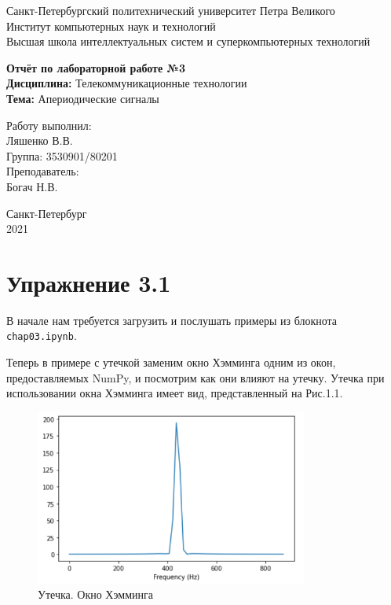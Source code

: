 \documentclass[a4paper,12pt]{report}
\begin{document}
 

\begin{titlepage}
\newpage
	\begin{center}
		\large Санкт-Петербургский политехнический университет Петра Великого\\
		Институт компьютерных наук и технологий\\
		Высшая школа интеллектуальных систем и суперкомпьютерных технологий\\
	\end{center}
\vspace{7cm}

\begin{center}
		\large \textbf{Отчёт по лабораторной работе №3} \\
		\textbf{Дисциплина:} Телекоммуникационные технологии\\
		\textbf{Тема:} Апериодические сигналы
\end{center}
\vspace{4cm}
	
\begin{flushright}
		\large Работу выполнил:\\ Ляшенко В.В.\\
		Группа: 3530901/80201\\
		Преподаватель:\\ Богач Н.В.
\end{flushright}

\vspace{\fill}
\begin{center}
	\large Санкт-Петербург\\ 2021
	\end{center}
\end{titlepage}

\tableofcontents
\listoffigures
\lstlistoflistings

\chapter{Упражнение 3.1}
    В начале нам требуется загрузить и послушать примеры из блокнота \texttt{chap03.ipynb}.
    
    Теперь в примере с утечкой заменим окно Хэмминга одним из окон, предоставляемых NumPy, и посмотрим как они влияют на утечку. Утечка при использовании окна Хэмминга имеет вид, представленный на Рис.1.1.
\begin{figure}[H]
        \centering
        \includegraphics[width=0.8\textwidth]{fig1-1.PNG}
        \caption{Утечка. Окно Хэмминга}
        \label{fig:fig1-1}
\end{figure}
\end{document}
